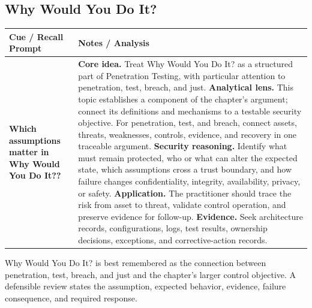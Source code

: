 \documentclass[11pt]{article}
\newcommand{\CornellHeader}{%
\rowcolor{Navy}\color{white}\bfseries Cue / Recall Prompt & \color{white}\bfseries Notes / Analysis\\\hline}
\newcommand{\CornellRow}[2]{%
\cellcolor{CueGray}\RaggedRight\textbf{#1} & \RaggedRight #2\\\hline}
\begin{document}
\subsection*{Why Would You Do It?}
\begin{longtable}{>{\RaggedRight\arraybackslash}p{}|>{\RaggedRight\arraybackslash}p{}}
\CornellHeader
\CornellRow{Which assumptions matter in Why Would You Do It??}{\textbf{Core idea.} Treat Why Would You Do It? as a structured part of Penetration Testing, with particular attention to penetration, test, breach, and just. \textbf{Analytical lens.} This topic establishes a component of the chapter's argument; connect its definitions and mechanisms to a testable security objective. For penetration, test, and breach, connect assets, threats, weaknesses, controls, evidence, and recovery in one traceable argument. \textbf{Security reasoning.} Identify what must remain protected, who or what can alter the expected state, which assumptions cross a trust boundary, and how failure changes confidentiality, integrity, availability, privacy, or safety. \textbf{Application.} The practitioner should trace the risk from asset to threat, validate control operation, and preserve evidence for follow-up. \textbf{Evidence.} Seek architecture records, configurations, logs, test results, ownership decisions, exceptions, and corrective-action records.}
\end{longtable}
\begin{topicsummary}
Why Would You Do It? is best remembered as the connection between penetration, test, breach, and just and the chapter's larger control objective. A defensible review states the assumption, expected behavior, evidence, failure consequence, and required response.
\end{topicsummary}
\end{document}

